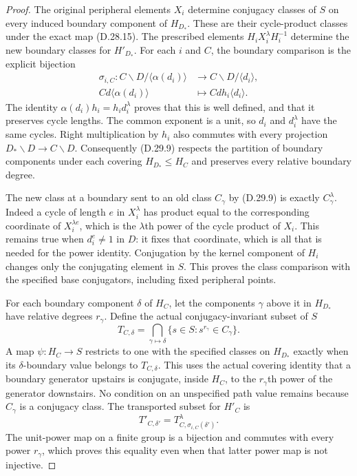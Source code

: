 \begin{proof}
The original peripheral elements $X_i$ determine
conjugacy classes of $S$ on every induced boundary
component of $H_{D_*}$.  These are their cycle-product
classes under the exact map \textup{(D.28.15)}.
The prescribed elements
$H_iX_i^\lambda H_i^{-1}$ determine the new boundary
classes for $H'_{D_*}$.
For each $i$ and $C$, the boundary comparison is the
explicit bijection
\[
 \begin{split}
 \sigma_{i,C}:
 C\backslash D/\langle\alpha(d_i)\rangle
       &\longrightarrow C\backslash D/\langle d_i\rangle,\\
       C d\langle\alpha(d_i)\rangle
       &\longmapsto C d h_i\langle d_i\rangle.
 \end{split}
 \tag{D.29.9}
\]
The identity $\alpha(d_i)h_i=h_i d_i^\lambda$
proves that this is well defined, and that it preserves
cycle lengths.  The common exponent is a unit, so
$d_i$ and $d_i^\lambda$ have the same cycles.
Right multiplication by $h_i$ also commutes with
every projection $D_*\backslash D\to C\backslash D$.
Consequently \textup{(D.29.9)} respects the partition
of boundary components under each covering
$H_{D_*}\leq H_C$ and preserves every relative
boundary degree.

The new class at a boundary sent to an old class
$C_\gamma$ by \textup{(D.29.9)} is exactly
$C_\gamma^\lambda$.  Indeed a cycle of length $e$
in $X_i^\lambda$ has product equal to the corresponding
coordinate of $X_i^{\lambda e}$, which is the
$\lambda$th power of the cycle product of $X_i$.
This remains true when $d_i^e\ne1$ in $D$: it fixes
that coordinate, which is all that is needed for the
power identity.  Conjugation by the kernel component
of $H_i$ changes only the conjugating element in $S$.
This proves the class comparison with the specified
base conjugators, including fixed peripheral points.

For each boundary component $\delta$ of $H_C$, let
the components $\gamma$ above it in $H_{D_*}$ have
relative degrees $r_\gamma$.  Define the actual
conjugacy-invariant subset of $S$
\[
 T_{C,\delta}=\bigcap_{\gamma\mapsto\delta}
          \{s\in S:s^{r_\gamma}\in C_\gamma\}.
 \tag{D.29.10}
\]
A map $\psi:H_C\to S$ restricts to one with the
specified classes on $H_{D_*}$ exactly when its
$\delta$-boundary value belongs to $T_{C,\delta}$.
This uses the actual covering identity that a
boundary generator upstairs is conjugate, inside
$H_C$, to the $r_\gamma$th power of the generator
downstairs.  No condition on an unspecified path
value remains because $C_\gamma$ is a conjugacy class.
The transported subset for $H'_C$ is
\[
       T'_{C,\delta'}=
       T_{C,\sigma_{i,C}(\delta')}^\lambda.
 \tag{D.29.11}
\]
The unit-power map on a finite group is a bijection
and commutes with every power $r_\gamma$, which
proves this equality even when that latter power
map is not injective.


\end{proof}
